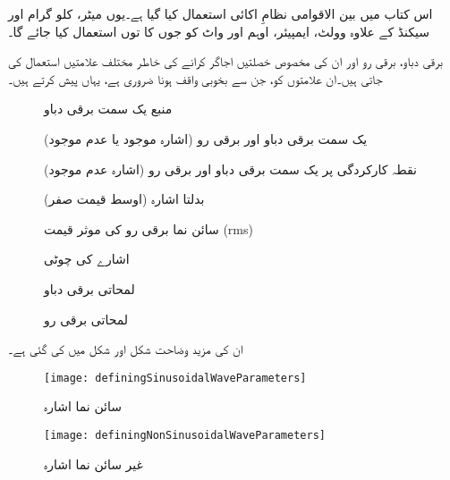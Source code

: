 
اس کتاب میں بین الاقوامی نظامِ اکائی  استعمال کیا گیا ہے۔یوں میٹر، کلو گرام اور سیکنڈ کے علاوہ وولٹ، ایمپیئر، اوہم اور واٹ کو جوں کا توں استعمال کیا جائے گا۔

برقی دباو، برقی رو اور ان کی مخصوص خصلتیں اجاگر کرانے کی خاطر مختلف علامتیں استعمال کی جاتی ہیں۔ان علامتوں کو، جن سے بخوبی واقف ہونا ضروری ہے، یہاں پیش کرتے ہیں۔

\begin{description}
\item
[]  منبع یک سمت برقی دباو
\item
[] یک سمت برقی دباو اور برقی رو  (اشارہ موجود یا عدم موجود)
\item
[]  نقطہ کارکردگی پر یک سمت برقی دباو اور برقی رو (اشارہ عدم موجود)
\item
[] بدلتا اشارہ (اوسط قیمت صفر)
\item
[ ]  سائن نما برقی رو کی موثر قیمت (rms)
\item
[ ]  اشارے کی چوٹی
\item
[ ] لمحاتی برقی دباو
\item
[ ] لمحاتی برقی رو
\end{description}

\FloatBarrier

ان کی مزید وضاحت شکل   اور شکل  میں کی گئی ہے۔

\begin{figure}
\centering
\texttt{[image: definingSinusoidalWaveParameters]}
\caption{سائن نما اشارہ}
\label{شکل_سائن_نما_اشارے_کے_جزو}
\end{figure}

\begin{figure}
\centering
\texttt{[image: definingNonSinusoidalWaveParameters]}
\caption{غیر سائن نما اشارہ}
\label{شکل_غیر_سائن_نما_اشارے_کے_جزو}
\end{figure}

\FloatBarrier


